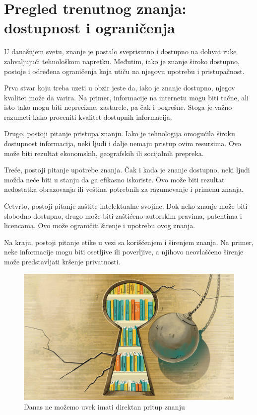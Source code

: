 \documentclass{article}
\begin{document}

\section{Pregled trenutnog znanja: dostupnost i ograničenja}

U današnjem svetu, znanje je postalo sveprisutno i dostupno na dohvat ruke zahvaljujući tehnološkom napretku. Međutim, iako je znanje široko dostupno, postoje i određena ograničenja koja utiču na njegovu upotrebu i pristupačnost.

Prva stvar koju treba uzeti u obzir jeste da, iako je znanje dostupno, njegov kvalitet može da varira. Na primer, informacije na internetu mogu biti tačne, ali isto tako mogu biti neprecizne, zastarele, pa čak i pogrešne. Stoga je važno razumeti kako proceniti kvalitet dostupnih informacija.

Drugo, postoji pitanje pristupa znanju. Iako je tehnologija omogućila široku dostupnost informacija, neki ljudi i dalje nemaju pristup ovim resursima. Ovo može biti rezultat ekonomskih, geografskih ili socijalnih prepreka.

Treće, postoji pitanje upotrebe znanja. Čak i kada je znanje dostupno, neki ljudi možda neće biti u stanju da ga efikasno iskoriste. Ovo može biti rezultat nedostatka obrazovanja ili veština potrebnih za razumevanje i primenu znanja.

Četvrto, postoji pitanje zaštite intelektualne svojine. Dok neko znanje može biti slobodno dostupno, drugo može biti zaštićeno autorskim pravima, patentima i licencama. Ovo može ograničiti širenje i upotrebu ovog znanja.

Na kraju, postoji pitanje etike u vezi sa korišćenjem i širenjem znanja. Na primer, neke informacije mogu biti osetljive ili poverljive, a njihovo neovlašćeno širenje može predstavljati kršenje privatnosti.

\begin{figure}[htbp]
    \center
    \includegraphics[scale=0.2]{img/lock.png}
    \caption{Danas ne možemo uvek imati direktan pritup znanju}
\end{figure}
\end{document}
